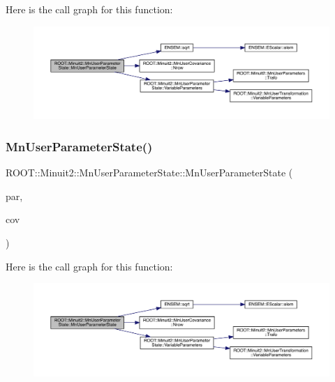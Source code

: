 Here is the call graph for this function\+:
\nopagebreak
\begin{figure}[H]
\begin{center}
\leavevmode
\includegraphics[width=350pt]{d3/de0/classROOT_1_1Minuit2_1_1MnUserParameterState_a146a0e2f845431830d795b919bb8f594_cgraph}
\end{center}
\end{figure}
\mbox{\label{classROOT_1_1Minuit2_1_1MnUserParameterState_adc49551ffd44db2eb6e2decfdafb2625}} 
\subsubsection{\texorpdfstring{MnUserParameterState()}{MnUserParameterState()}\hspace{0.1cm}{\footnotesize\ttfamily [5/24]}}
{\footnotesize\ttfamily R\+O\+O\+T\+::\+Minuit2\+::\+Mn\+User\+Parameter\+State\+::\+Mn\+User\+Parameter\+State (\begin{DoxyParamCaption}\item[{const std\+::vector$<$ double $>$ \&}]{par,  }\item[{const \mbox{\hyperlink{classROOT_1_1Minuit2_1_1MnUserCovariance}{Mn\+User\+Covariance}} \&}]{cov }\end{DoxyParamCaption})}

Here is the call graph for this function\+:
\nopagebreak
\begin{figure}[H]
\begin{center}
\leavevmode
\includegraphics[width=350pt]{d3/de0/classROOT_1_1Minuit2_1_1MnUserParameterState_adc49551ffd44db2eb6e2decfdafb2625_cgraph}
\end{center}
\end{figure}
\mbox{\label{classROOT_1_1Minuit2_1_1MnUserParameterState_aafeef85943691c9736a58d6a7830259a}} 
